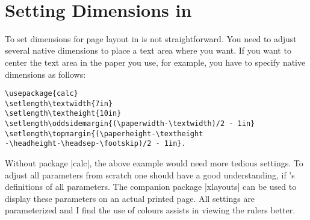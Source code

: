\clearpage

\restoregeometry


\lipsum[1]


\begin{adjustmargins}{-0.4\textwidth}{0.1\textwidth}
\topline

^^A

\bottomline
\end{adjustmargins}

\lipsum[2]


 
\section{Setting Dimensions in \latex}

To set dimensions for page layout in \latex is not straightforward. You need to adjust several \latex
native dimensions to place a text area where you want. If you want to center the text area in the paper
you use, for example, you have to specify native dimensions as follows:

\begin{verbatim}
\usepackage{calc}
\setlength\textwidth{7in}
\setlength\textheight{10in}
\setlength\oddsidemargin{(\paperwidth-\textwidth)/2 - 1in}
\setlength\topmargin{(\paperheight-\textheight
-\headheight-\headsep-\footskip)/2 - 1in}.
\end{verbatim}

Without package |calc|, the above example would need more tedious settings. To adjust all parameters from scratch one should have a good understanding, if \latexe's definitions of all parameters. The companion package |xlayouts| can be used to display these parameters on an actual printed page. All settings are parameterized and I find the use of colours assists in viewing the rulers better.




